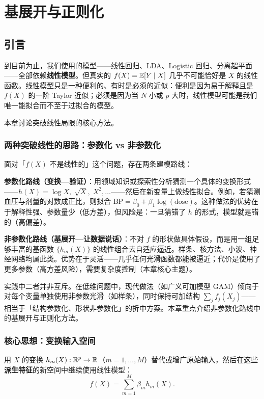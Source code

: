 \chapter{基展开与正则化}

\section{引言}

到目前为止，我们使用的模型——线性回归、LDA、Logistic 回归、分离超平面——全部依赖\textbf{线性模型}。但真实的 $f(X)=\mathbb{E}[Y\mid X]$ 几乎不可能恰好是 $X$ 的线性函数。线性模型只是一种便利的、有时是必须的近似：便利是因为易于解释且是 $f(X)$ 的一阶 Taylor 近似；必须是因为当 $N$ 小或 $p$ 大时，线性模型可能是我们唯一能拟合而不至于过拟合的模型。

本章讨论突破线性局限的核心方法。

\subsection{两种突破线性的思路：参数化 vs 非参数化}

面对「$f(X)$ 不是线性的」这个问题，存在两条建模路线：

\textbf{参数化路线（变换—验证）}：用领域知识或探索性分析猜测一个具体的变换形式——$h(X)=\log X,\;\sqrt{X},\;X^2,\ldots$——然后在新变量上做线性拟合。例如，若猜测血压与剂量的对数成正比，则拟合 $\text{BP} = \beta_0 + \beta_1 \log(\text{dose})$。这种做法的优势在于解释性强、参数量少（低方差），但风险是：一旦猜错了 $h$ 的形式，模型就是错的（高偏差）。

\textbf{非参数化路线（基展开—让数据说话）}：不对 $f$ 的形状做具体假设，而是用一组足够丰富的基函数 $\{h_m(X)\}$ 的线性组合去自适应逼近。样条、核方法、小波、神经网络均属此类。优势在于灵活——几乎任何光滑函数都能被逼近；代价是使用了更多参数（高方差风险），需要复杂度控制（本章核心主题）。

实践中二者并非互斥。在低维问题中，现代做法（如广义可加模型 GAM）倾向于对每个变量单独使用非参数光滑（如样条），同时保持可加结构 $\sum_j f_j(X_j)$——相当于「结构参数化、形状非参数化」的折中方案。本章重点介绍非参数化路线中的基展开与正则化方法。

\subsection{核心思想：变换输入空间}

用 $X$ 的变换 $h_m(X) : \mathbb{R}^p \to \mathbb{R}$（$m = 1,\ldots,M$）替代或增广原始输入，然后在这些\textbf{派生特征}的新空间中继续使用线性模型：
\begin{equation}\label{eq:basis_expansion}
    f(X) = \sum_{m=1}^{M} \beta_m h_m(X).
\end{equation}


